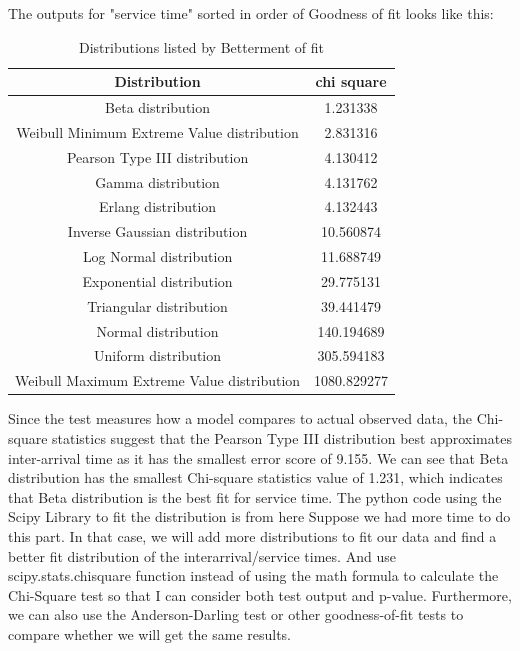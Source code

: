 \documentclass{article}
\begin{document}
The outputs for "service time" sorted in order of Goodness of fit looks like this:


\begin{table}[H]
    \caption{Distributions listed by Betterment of fit}
    \label{tab:Service Best Fit}
    \begin{center}
    \begin{tabular}{c S}
        \toprule
        \textbf{Distribution} & \textbf{chi square}\\
        \midrule
        Beta distribution & 1.231338\\
        Weibull Minimum Extreme Value distribution & 2.831316\\
        Pearson Type III distribution & 4.130412\\
        Gamma distribution & 4.131762\\
        Erlang distribution & 4.132443\\
        Inverse Gaussian distribution & 10.560874\\
        Log Normal distribution & 11.688749\\
        Exponential distribution & 29.775131\\
        Triangular distribution & 39.441479\\
        Normal distribution & 140.194689\\
        Uniform distribution & 305.594183\\
        Weibull Maximum Extreme Value distribution & 1080.829277\\
        \bottomrule
    \end{tabular}
    \end{center}
\end{table}

Since the test measures how a model compares to actual observed data, the Chi-square statistics suggest that the Pearson Type III distribution best approximates inter-arrival time as it has the smallest error score of 9.155. We can see that Beta distribution has the smallest Chi-square statistics value of 1.231, which indicates that Beta distribution is the best fit for service time. The python code using the Scipy Library to fit the distribution is from here\cite{git} Suppose we had more time to do this part. In that case, we will add more distributions to fit our data and find a better fit distribution of the interarrival/service times. And use scipy.stats.chisquare function instead of using the math formula to calculate the Chi-Square test so that I can consider both test output and p-value. Furthermore, we can also use the Anderson-Darling test or other goodness-of-fit tests to compare whether we will get the same results.
\end{document}
